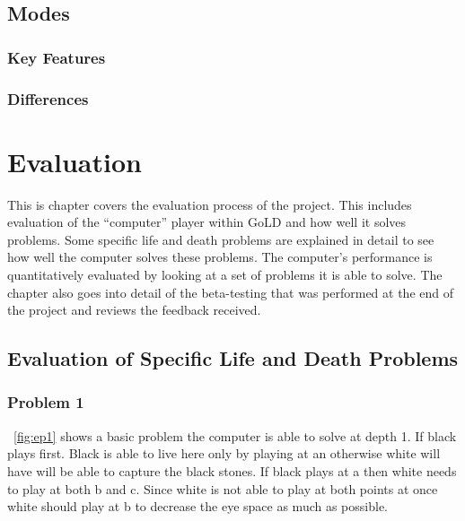 \documentclass{l4proj}
\begin{document}
\section{Modes}

\subsection{Key Features}


\subsection{Differences}






\chapter{Evaluation}

This is chapter covers the evaluation process of the project. This includes evaluation of the “computer” player within GoLD and how well it solves problems. Some specific life and death problems are explained in detail to see how well the computer solves these problems. The computer’s performance is quantitatively evaluated by looking at a set of problems it is able to solve. The chapter also goes into detail of the beta-testing that was performed at the end of the project and reviews the feedback received.

\section{Evaluation of Specific Life and Death Problems}
\subsection{Problem 1}
~\autoref{fig:ep1}  shows a basic problem the computer is able to solve at depth 1. If black plays first. Black is able to live here only by playing at an otherwise white will have will be able to capture the black stones. If black plays at a then white needs to play at both b and c. Since white is not able to play at both points at once white should play at b to decrease the eye space as much as possible.
\end{document}
